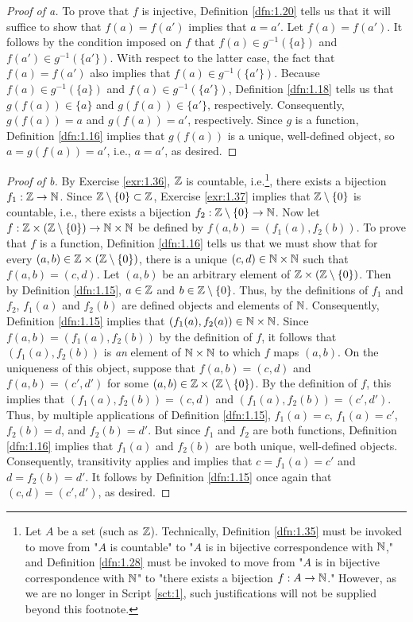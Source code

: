 \documentclass[../main.tex]{subfiles}
\begin{document}
\begin{theorem}
\begin{lemma*}
\begin{proof}[Proof of a]
            To prove that $f$ is injective, Definition \ref{dfn:1.20} tells us that it will suffice to show that $f(a)=f(a')$ implies that $a=a'$. Let $f(a)=f(a')$. It follows by the condition imposed on $f$ that $f(a)\in g^{-1}(\{a\})$ and $f(a')\in g^{-1}(\{a'\})$. With respect to the latter case, the fact that $f(a)=f(a')$ also implies that $f(a)\in g^{-1}(\{a'\})$. Because $f(a)\in g^{-1}(\{a\})$ and $f(a)\in g^{-1}(\{a'\})$, Definition \ref{dfn:1.18} tells us that $g(f(a))\in\{a\}$ and $g(f(a))\in\{a'\}$, respectively. Consequently, $g(f(a))=a$ and $g(f(a))=a'$, respectively. Since $g$ is a function, Definition \ref{dfn:1.16} implies that $g(f(a))$ is a unique, well-defined object, so $a=g(f(a))=a'$, i.e., $a=a'$, as desired.
        \end{proof}
        \begin{proof}[Proof of b]
            By Exercise \ref{exr:1.36}, $\mathbb{Z}$ is countable, i.e.\footnote{Let $A$ be a set (such as $\mathbb{Z}$). Technically, Definition \ref{dfn:1.35} must be invoked to move from "$A$ is countable" to "$A$ is in bijective correspondence with $\mathbb{N}$," and Definition \ref{dfn:1.28} must be invoked to move from "$A$ is in bijective correspondence with $\mathbb{N}$" to "there exists a bijection $f:A\to\mathbb{N}$." However, as we are no longer in Script \ref{sct:1}, such justifications will not be supplied beyond this footnote.}, there exists a bijection $f_1:\mathbb{Z}\to\mathbb{N}$. Since $\mathbb{Z}\setminus\{0\}\subset\mathbb{Z}$, Exercise \ref{exr:1.37} implies that $\mathbb{Z}\setminus\{0\}$ is countable, i.e., there exists a bijection $f_2:\mathbb{Z}\setminus\{0\}\to\mathbb{N}$. Now let $f:\mathbb{Z}\times(\mathbb{Z}\setminus\{0\})\to\mathbb{N}\times\mathbb{N}$ be defined by $f(a,b)=(f_1(a),f_2(b))$. To prove that $f$ is a function, Definition \ref{dfn:1.16} tells us that we must show that for every $(a,b)\in\mathbb{Z}\times(\mathbb{Z}\setminus\{0\})$, there is a unique $(c,d)\in\mathbb{N}\times\mathbb{N}$ such that $f(a,b)=(c,d)$. Let $(a,b)$ be an arbitrary element of $\mathbb{Z}\times(\mathbb{Z}\setminus\{0\})$. Then by Definition \ref{dfn:1.15}, $a\in\mathbb{Z}$ and $b\in\mathbb{Z}\setminus\{0\}$. Thus, by the definitions of $f_1$ and $f_2$, $f_1(a)$ and $f_2(b)$ are defined objects and elements of $\mathbb{N}$. Consequently, Definition \ref{dfn:1.15} implies that $(f_1(a),f_2(a))\in\mathbb{N}\times\mathbb{N}$. Since $f(a,b)=(f_1(a),f_2(b))$ by the definition of $f$, it follows that $(f_1(a),f_2(b))$ is \emph{an} element of $\mathbb{N}\times\mathbb{N}$ to which $f$ maps $(a,b)$. On the uniqueness of this object, suppose that $f(a,b)=(c,d)$ and $f(a,b)=(c',d')$ for some $(a,b)\in\mathbb{Z}\times(\mathbb{Z}\setminus\{0\})$. By the definition of $f$, this implies that $(f_1(a),f_2(b))=(c,d)$ and $(f_1(a),f_2(b))=(c',d')$. Thus, by multiple applications of Definition \ref{dfn:1.15}, $f_1(a)=c$, $f_1(a)=c'$, $f_2(b)=d$, and $f_2(b)=d'$. But since $f_1$ and $f_2$ are both functions, Definition \ref{dfn:1.16} implies that $f_1(a)$ and $f_2(b)$ are both unique, well-defined objects. Consequently, transitivity applies and implies that $c=f_1(a)=c'$ and $d=f_2(b)=d'$. It follows by Definition \ref{dfn:1.15} once again that $(c,d)=(c',d')$, as desired.\par

\end{proof}
\end{lemma*}
\end{theorem}
\end{document}
